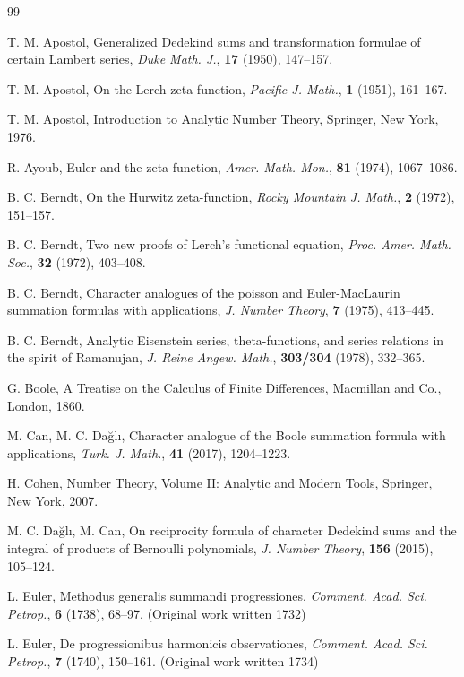 \documentclass[reqno]{amsart}
\numberwithin{equation}{section}
\begin{document}
\begin{thebibliography}{99}

 T. M. Apostol, Generalized Dedekind sums and transformation formulae of certain Lambert series, \emph{Duke Math. J.}, \textbf{17} (1950), 147--157.

 T. M. Apostol, On the Lerch zeta function, \emph{Pacific J. Math.}, \textbf{1} (1951), 161--167.

 T. M. Apostol, Introduction to Analytic Number Theory, Springer, New York, 1976.

 R. Ayoub, Euler and the zeta function, \emph{Amer. Math. Mon.}, \textbf{81} (1974), 1067--1086.

 B. C. Berndt, On the Hurwitz zeta-function, \emph{Rocky Mountain J. Math.}, \textbf{2} (1972), 151--157.

 B. C. Berndt, Two new proofs of Lerch's functional equation, \emph{Proc. Amer. Math. Soc.}, \textbf{32} (1972), 403--408.

 B. C. Berndt, Character analogues of the poisson and Euler-MacLaurin summation formulas with applications, \emph{J. Number Theory}, \textbf{7} (1975), 413--445.

 B. C. Berndt, Analytic Eisenstein series, theta-functions, and series relations in the spirit of Ramanujan, \emph{J. Reine Angew. Math.}, \textbf{303/304} (1978), 332--365.

 G. Boole, A Treatise on the Calculus of Finite Differences, Macmillan and Co., London, 1860.

 M. Can, M. C. Da\u{g}l{\i}, Character analogue of the Boole summation formula with applications, \emph{Turk. J. Math.}, \textbf{41} (2017), 1204--1223.

 H. Cohen, Number Theory, Volume II: Analytic and Modern Tools, Springer, New York, 2007.

 M. C. Da\u{g}l{\i}, M. Can, On reciprocity formula of character Dedekind sums and the integral of products of Bernoulli polynomials, \emph{J. Number Theory}, \textbf{156} (2015), 105--124.

 L. Euler,  Methodus generalis summandi progressiones, \emph{Comment. Acad. Sci. Petrop.}, \textbf{6} (1738), 68--97. (Original work written 1732)

 L. Euler, De progressionibus harmonicis observationes, \emph{Comment. Acad. Sci. Petrop.}, \textbf{7} (1740), 150--161. (Original work written 1734)


\end{thebibliography}
\end{document}

